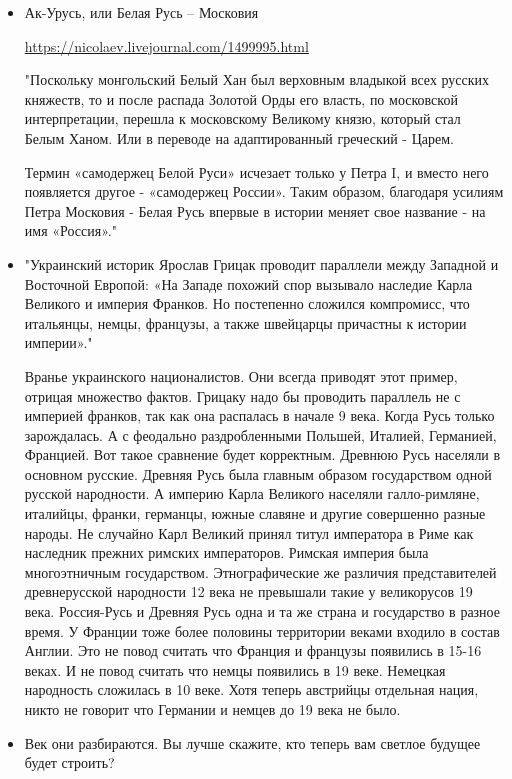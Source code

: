\begin{itemize}
\item {}

Ак-Урусь, или Белая Русь – Московия

\url{https://nicolaev.livejournal.com/1499995.html}

"Поскольку монгольский Белый Хан был верховным владыкой всех русских княжеств,
то и после распада Золотой Орды его власть, по московской интерпретации,
перешла к московскому Великому князю, который стал Белым Ханом. Или в переводе
на адаптированный греческий - Царем.

Термин «самодержец Белой Руси» исчезает только у Петра I, и вместо него
появляется другое - «самодержец России». Таким образом, благодаря усилиям Петра
Московия - Белая Русь впервые в истории меняет свое название - на имя
«Россия»."

\item {}

"Украинский историк Ярослав Грицак проводит параллели между Западной и
Восточной Европой: «На Западе похожий спор вызывало наследие Карла Великого и
империя Франков. Но постепенно сложился компромисс, что итальянцы, немцы,
французы, а также швейцарцы причастны к истории империи»."

Вранье украинского националистов. Они всегда приводят этот пример, отрицая
множество фактов. Грицаку надо бы проводить параллель не с империей франков,
так как она распалась в начале 9 века. Когда Русь только зарождалась. А с
феодально раздробленными Польшей, Италией, Германией, Францией. Вот такое
сравнение будет корректным. Древнюю Русь населяли в основном русские. Древняя
Русь была главным образом государством одной русской народности. А империю
Карла Великого населяли галло-римляне, италийцы, франки, германцы, южные
славяне и другие совершенно разные народы. Не случайно Карл Великий принял
титул императора в Риме как наследник прежних римских императоров. Римская
империя была многоэтничным государством. Этнографические же различия
представителей древнерусской народности 12 века не превышали такие у
великорусов 19 века. Россия-Русь и Древняя Русь одна и та же страна и
государство в разное время. У Франции тоже более половины территории веками
входило в состав Англии. Это не повод считать что Франция и французы появились
в 15-16 веках. И не повод считать что немцы появились в 19 веке. Немецкая
народность сложилась в 10 веке. Хотя теперь австрийцы отдельная нация, никто не
говорит что Германии и немцев до 19 века не было.

\item {}
Век они разбираются. Вы лучше скажите, кто теперь вам светлое будущее будет строить? 



\end{itemize}
